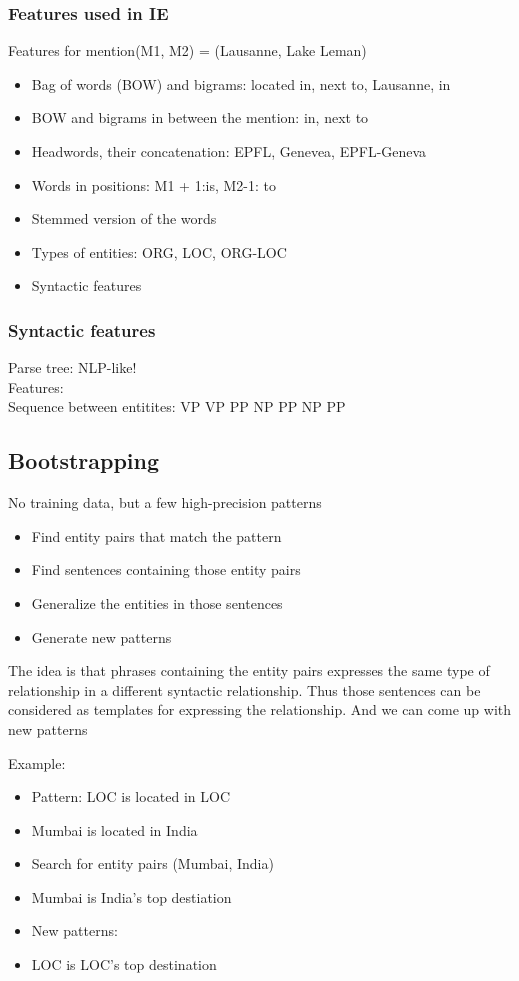 \subsubsection{Features used in IE}

Features for mention(M1, M2) = (Lausanne, Lake Leman)
\begin{itemize}
\item Bag of words (BOW) and bigrams: located in, next to, Lausanne,
  in
\item BOW and bigrams in between the mention: in, next to
\item Headwords, their concatenation: EPFL, Genevea, EPFL-Geneva
\item Words in positions: M1 + 1:is, M2-1: to
\item Stemmed version of the words
\item Types of entities: ORG, LOC, ORG-LOC
\item Syntactic features
\end{itemize}

\subsubsection{Syntactic features}
Parse tree: NLP-like! \\
Features: \\
Sequence between entitites: VP VP PP NP PP NP PP

\subsection{Bootstrapping}

No training data, but a few high-precision patterns

\begin{itemize}
\item Find entity pairs that match the pattern
\item Find sentences containing those entity pairs
\item Generalize the entities in those sentences
\item Generate new patterns
\end{itemize}

The idea is that phrases containing the entity pairs expresses the
same type of relationship in a different syntactic relationship. Thus
those sentences can be considered as templates for expressing the
relationship. And we can come up with new patterns

Example:
\begin{itemize}
\item Pattern: LOC is located in LOC
\item Mumbai is located in India
\item Search for entity pairs (Mumbai, India)
\item Mumbai is India's top destiation
\item New patterns:
\item LOC is LOC's top destination
\end{itemize}


